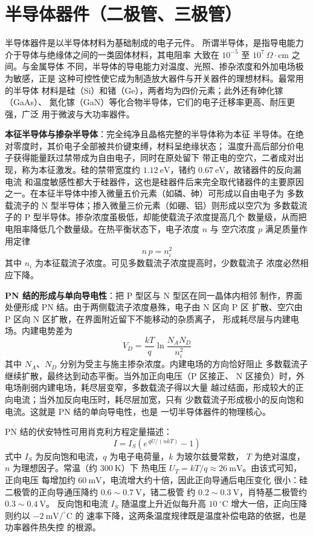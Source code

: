 
\section{半导体器件（二极管、三极管）}
\label{sec:semiconductor_devices}

半导体器件是以半导体材料为基础制成的电子元件。
所谓半导体，是指导电能力介于导体与绝缘体之间的一类固体材料，其电阻率
大致在 $10^{-5}$ 至 $10^{7}\ \Omega\cdot\mathrm{cm}$ 之间。与金属导体
不同，半导体的导电能力对温度、光照、掺杂浓度和外加电场极为敏感，正是
这种可控性使它成为制造放大器件与开关器件的理想材料。最常用的半导体
材料是硅（Si）和锗（Ge），两者均为四价元素；此外还有砷化镓（GaAs）、
氮化镓（GaN）等化合物半导体，它们的电子迁移率更高、耐压更强，广泛
用于微波与大功率器件。

\textbf{本征半导体与掺杂半导体}：完全纯净且晶格完整的半导体称为本征
半导体。在绝对零度时，其价电子全部被共价键束缚，材料呈绝缘状态；
温度升高后部分价电子获得能量跃过禁带成为自由电子，同时在原处留下
带正电的空穴，二者成对出现，称为本征激发。硅的禁带宽度约
$1.12\ \mathrm{eV}$，锗约 $0.67\ \mathrm{eV}$，故锗器件的反向漏电流
和温度敏感性都大于硅器件，这也是硅器件后来完全取代锗器件的主要原因
之一。在本征半导体中掺入微量五价元素（如磷、砷）可形成以自由电子为
多数载流子的 N 型半导体；掺入微量三价元素（如硼、铝）则形成以空穴为
多数载流子的 P 型半导体。掺杂浓度虽极低，却能使载流子浓度提高几个
数量级，从而把电阻率降低几个数量级。在热平衡状态下，电子浓度 $n$ 与
空穴浓度 $p$ 满足质量作用定律
\[
n\,p = n_i^2
\]
其中 $n_i$ 为本征载流子浓度。可见多数载流子浓度提高时，少数载流子
浓度必然相应下降。

\textbf{PN 结的形成与单向导电性}：把 P 型区与 N 型区在同一晶体内相邻
制作，界面处便形成 PN 结。由于两侧载流子浓度悬殊，电子由 N 区向 P 区
扩散、空穴由 P 区向 N 区扩散，在界面附近留下不能移动的杂质离子，
形成耗尽层与内建电场。内建电势差为
\[
V_D = \frac{kT}{q}\ln\frac{N_A N_D}{n_i^2}
\]
其中 $N_A$、$N_D$ 分别为受主与施主掺杂浓度。内建电场的方向恰好阻止
多数载流子继续扩散，最终达到动态平衡。当外加正向电压（P 区接正、
N 区接负）时，外电场削弱内建电场，耗尽层变窄，多数载流子得以大量
越过结面，形成较大的正向电流；当外加反向电压时，耗尽层加宽，只有
少数载流子形成极小的反向饱和电流。这就是 PN 结的单向导电性，也是
一切半导体器件的物理核心。

PN 结的伏安特性可用肖克利方程定量描述：
\begin{equation}
I = I_S\left(e^{\,qU/(nkT)} - 1\right)
\end{equation}
式中 $I_S$ 为反向饱和电流，$q$ 为电子电荷量，$k$ 为玻尔兹曼常数，
$T$ 为绝对温度，$n$ 为理想因子。常温（约 $300\ \mathrm{K}$）下
热电压 $U_T = kT/q \approx 26\ \mathrm{mV}$。由该式可知，正向电压
每增加约 $60\ \mathrm{mV}$，电流增大约十倍，因此正向导通后电压变化
很小：硅二极管的正向导通压降约 $0.6\sim0.7\ \mathrm{V}$，锗二极管
约 $0.2\sim0.3\ \mathrm{V}$，肖特基二极管约 $0.3\sim0.4\ \mathrm{V}$。
反向饱和电流 $I_S$ 随温度上升近似每升高 $10\ ^{\circ}\mathrm{C}$
增大一倍，正向压降则约以 $-2\ \mathrm{mV}/^{\circ}\mathrm{C}$ 的
速率下降，这两条温度规律既是温度补偿电路的依据，也是功率器件热失控
的根源。

